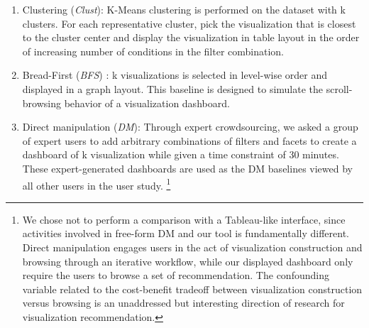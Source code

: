 \begin{enumerate}
	\item Clustering (\textit{Clust}): K-Means clustering is performed on the dataset with k clusters. For each representative cluster, pick the visualization that is closest to the cluster center and display the visualization in table layout in the order of increasing number of conditions in the filter combination.
	\item Bread-First (\textit{BFS}) : k visualizations is selected in level-wise order and displayed in a graph layout. This baseline is designed to simulate the scroll-browsing behavior of a visualization dashboard.
	\item Direct manipulation (\textit{DM}): Through expert crowdsourcing, we asked a group of expert users to add arbitrary combinations of filters and facets to create a dashboard of k visualization while given a time constraint of 30 minutes. These expert-generated dashboards are used as the DM baselines viewed by all other users in the user study. \footnote{We chose not to perform a comparison with a Tableau-like interface, since activities involved in free-form DM and our tool is fundamentally different. Direct manipulation engages users in the act of visualization construction and browsing through an iterative workflow, while our displayed dashboard only require the users to browse a set of recommendation. The confounding variable related to the cost-benefit tradeoff between visualization construction versus browsing is an unaddressed but interesting direction of research for visualization recommendation.}
\end{enumerate}
